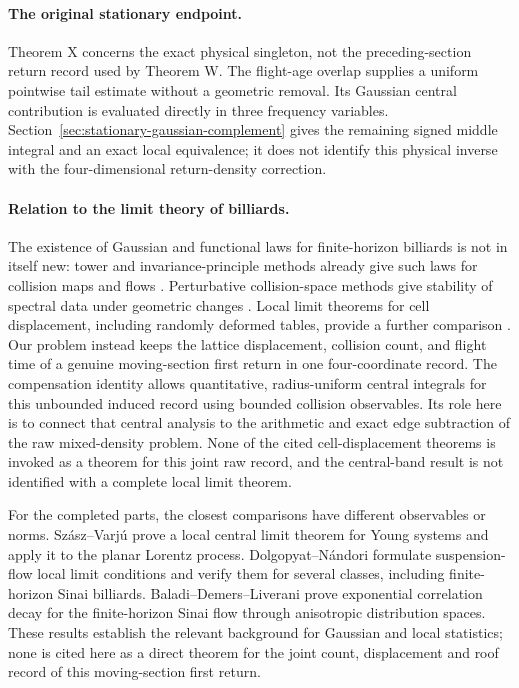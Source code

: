 \documentclass[11pt,reqno]{amsart}
\numberwithin{equation}{section}
\theoremstyle{definition}\newtheorem{definition}[theorem]{Definition}
\theoremstyle{remark}\newtheorem{remark}[theorem]{Remark}
\begin{document}
\paragraph{The original stationary endpoint.}
Theorem X concerns the exact physical singleton, not the preceding-section
return record used by Theorem W. The flight-age overlap supplies a
uniform pointwise tail estimate without a geometric removal. Its
Gaussian central contribution is evaluated directly in three frequency
variables. Section~\ref{sec:stationary-gaussian-complement} gives the
remaining signed middle integral and an exact local equivalence; it
does not identify this physical inverse with the four-dimensional
return-density correction.

\paragraph{Relation to the limit theory of billiards.}
The existence of Gaussian and functional laws for finite-horizon
billiards is not in itself new: tower and invariance-principle methods
already give such laws for collision maps and flows
\cite{Young,MN}. Perturbative collision-space methods give stability of
spectral data under geometric changes \cite{DZ}. Local limit theorems
for cell displacement, including randomly deformed tables, provide a
further comparison \cite{SV,DPZ}. Our problem instead keeps the lattice
displacement, collision count, and flight time of a genuine moving-section
first return in one four-coordinate record. The compensation identity
allows quantitative, radius-uniform central integrals for this
unbounded induced record using bounded collision observables. Its role
here is to connect that central analysis to the arithmetic and exact
edge subtraction of the raw mixed-density problem. None of the cited
cell-displacement theorems is invoked as a theorem for this joint raw
record, and the central-band result is not identified with a complete
local limit theorem.

For the completed parts, the closest comparisons have different
observables or norms. Sz\'asz--Varj\'u \cite{SV} prove a local central
limit theorem for Young systems and apply it to the planar Lorentz
process. Dolgopyat--N\'andori \cite{DN} formulate suspension-flow local
limit conditions and verify them for several classes, including
finite-horizon Sinai billiards. Baladi--Demers--Liverani \cite{BDL}
prove exponential correlation decay for the finite-horizon Sinai flow
through anisotropic distribution spaces. These results establish the
relevant background for Gaussian and local statistics; none is cited
here as a direct theorem for the joint count, displacement and roof
record of this moving-section first return.
\end{document}

